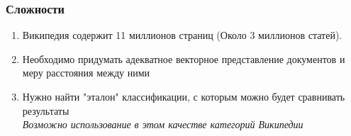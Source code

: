 \documentclass{beamer}
\begin{document}
\begin{frame}
\frametitle{Сложности}
\begin{enumerate}

\item {
Википедия содержит 11 миллионов страниц (Около 3 миллионов статей).
}
\item {
Необходимо придумать адекватное векторное представление документов и меру расстояния между ними
}
\item {
Нужно найти "эталон" классификации, с которым можно будет сравнивать результаты\\
{\it Возможно использование в этом качестве категорий Википедии}
}

\end{enumerate}
\end{frame}
\end{document}
